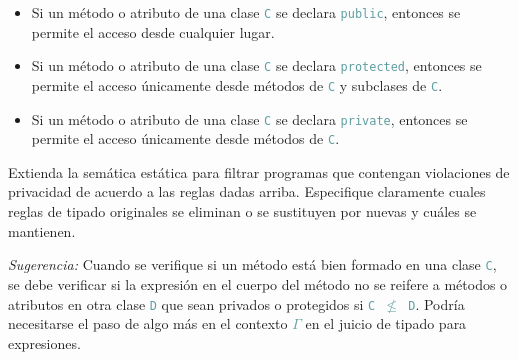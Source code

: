 \documentclass{article}
\newcommand{\tp}[1]{\textcolor{CadetBlue} {\texttt{#1}}}
\newcommand{\ti}[1]{\textcolor{RoyalPurple} {\textit{#1}}}
\begin{document}
\begin{enumerate}
        \begin{itemize}
            \item Si un método o atributo de una clase \tp{C} se declara
            \tp{public}, entonces se permite el acceso desde cualquier lugar.

            \item Si un método o atributo de una clase \tp{C} se declara
            \tp{protected}, entonces se permite el acceso únicamente desde
            métodos de \tp{C} y subclases de \tp{C}.

            \item Si un método o atributo de una clase \tp{C} se declara
            \tp{private}, entonces se permite el acceso únicamente desde
            métodos de \tp{C}.
        \end{itemize}

        Extienda la semática estática para filtrar programas que contengan
        violaciones de privacidad de acuerdo a las reglas dadas arriba.
        Especifique claramente cuales reglas de tipado originales se eliminan o
        se sustituyen por nuevas y cuáles se mantienen.

        \ti{Sugerencia:} Cuando se verifique si un método está bien formado en
        una clase \tp{C}, se debe verificar si la expresión en el cuerpo del
        método no se reifere a métodos o atributos en otra clase \tp{D} que sean
        privados o protegidos si \tp{C $\not \leq$ D}. Podría necesitarse el
        paso de algo más en el contexto \tp{$\Gamma$} en el juicio de tipado
        para expresiones.

    \end{enumerate}
\end{document}
